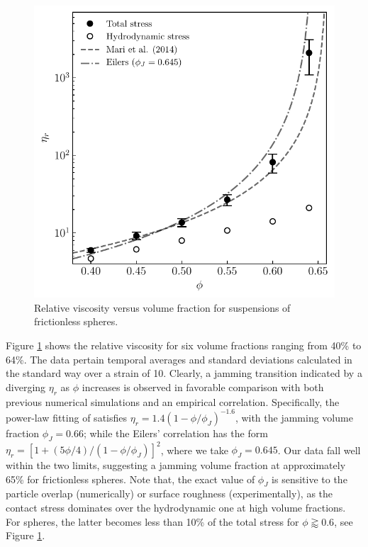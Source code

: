 \begin{figure}%
  \centering
  \includegraphics[width=0.64\columnwidth]{figs/curve_visc_fricless1.pdf}
  \caption{Relative viscosity versus volume fraction for suspensions of frictionless spheres.}
  \label{fig:visc}
\end{figure}

Figure \ref{fig:visc} shows the relative viscosity for six volume fractions ranging from 40\% to 64\%. The data pertain temporal averages and standard deviations calculated in the standard way over a strain of 10. Clearly, a jamming transition indicated by a diverging $\eta_r$ as $\phi$ increases is observed in favorable comparison with both previous numerical simulations and an empirical correlation. Specifically, the power-law fitting of \cite{Mari_Seto_2014JoR} satisfies $\eta_r=1.4(1-\phi/\phi_J)^{-1.6}$, with the jamming volume fraction $\phi_J=0.66$; while the Eilers' correlation has the form $\eta_r=[1+(5\phi/4)/(1-\phi/\phi_J)]^2$, where we take $\phi_J=0.645$.  Our data fall well within the two limits, suggesting a jamming volume fraction at approximately 65\% for frictionless spheres. Note that, the exact value of $\phi_J$ is sensitive to the particle overlap (numerically) or surface roughness (experimentally), as the contact stress dominates over the hydrodynamic one at high volume fractions. For spheres, the latter becomes less than 10\% of the total stress for $\phi \gtrapprox 0.6$, see Figure \ref{fig:visc}.


